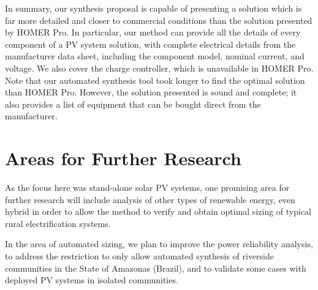 In summary, our synthesis proposal is capable of presenting a solution which is far more detailed and closer to commercial conditions than the solution presented by HOMER Pro. In particular, our method can provide all the details of every component of a PV system solution, with complete electrical details from the manufacturer data sheet, including the component model, nominal current, and voltage. We also cover the charge controller, which is unavailable in HOMER Pro. Note that our automated synthesis tool took longer to find the optimal solution than HOMER Pro. However, the solution presented is sound and complete; it also provides a list of equipment that can be bought direct from the manufacturer.


\section{Areas for Further Research}

As the focus here was stand-alone solar PV systems, one promising area for further research will include analysis of other types of renewable energy, even hybrid  in order to allow the method to verify and obtain optimal sizing of typical rural electrification systems.

In the area of automated sizing, we plan to improve the power reliability analysis, to address the restriction to only allow automated synthesis of riverside communities in the State of Amazonas (Brazil), and to validate some cases with deployed PV systems in isolated communities.


